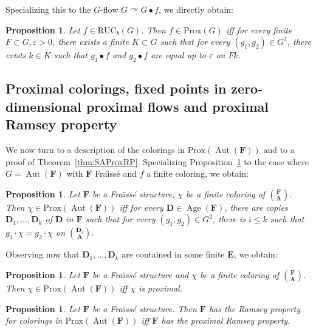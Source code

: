 \documentclass[11pt]{article}
\newtheorem{prop}[theo]{Proposition}
\theoremstyle{definition}
\numberwithin{equation}{section}
\numberwithin{figure}{section}
\numberwithin{table}{section}
\newcommand*{\mA}{\mathbf{A}}
\newcommand*{\mD}{\mathbf{D}}
\newcommand*{\mE}{\mathbf{E}}
\newcommand*{\mF}{\mathbf{F}}
\newcommand{\e}{\varepsilon}
\DeclareMathOperator{\Aut}{Aut}
\DeclareMathOperator{\Age}{Age}
\newcommand{\actson}{\curvearrowright}
\newcommand{\RUCB}{\mathrm{RUC}_{b}}
\begin{document}
Specializing this to the $G$-flow $G\actson \overline{G\bullet f}$, we directly obtain:

\begin{prop}\label{prop:ProxAlg}
Let $f\in \RUCB(G)$. Then $f\in \mathrm{Prox}(G)$ iff for every finite $F\subset G, \e>0$, there exists a finite $K\subset G$ such that for every $(g_{1}, g_{2})\in G^{2}$, there exists $k\in K$ such that $g_{1}\bullet f$ and $g_{2}\bullet f$ are equal up to $\e$ on $Fk$.
\end{prop}


\subsection{Proximal colorings, fixed points in zero-dimensional proximal flows and proximal Ramsey property}
\label{section:ProxColorings}

We now turn to a description of the colorings in $\mathrm{Prox}(\Aut(\mF))$ and to a proof of Theorem~\ref{thm:SAProxRP}. Specializing Proposition~\ref{prop:ProxAlg} to the case where $G=\Aut(\mF)$ with $\mF$ Fra\"{\i}ss\'e and $f$ a finite coloring, we obtain:

\begin{prop}
Let $\mF$ be a Fra\"{\i}ss\'e structure, $\chi$ be a finite coloring of $\binom{\mF}{\mA}$. Then $\chi \in \mathrm{Prox}(\Aut(\mF))$ iff for every $\mD \in \Age(\mF)$, there are copies $\mD_{1},\ldots,\mD_{k}$ of $\mD$ in $\mF$ such that for every $(g_{1}, g_{2})\in G^{2}$, there is $i\leq k$ such that $g_{1}\cdot \chi = g_{2}\cdot \chi$ on $\binom{\mD_{i}}{\mA}$.
\end{prop}

Observing now that $\mD_{1},\ldots,\mD_{k}$ are contained in some finite $\mE$, we obtain:

\begin{prop}\label{prop:ProxColorings}
Let $\mF$ be a Fra\"{\i}ss\'e structure and $\chi$ be a finite coloring of $\binom{\mF}{\mA}$. Then $\chi \in \mathrm{Prox}(\Aut(\mF))$ iff $\chi$ is proximal.
\end{prop}

\begin{prop}
Let $\mF$ be a Fra\"{\i}ss\'e structure. Then $\mF$ has the Ramsey property for colorings in $\mathrm{Prox}(\Aut(\mF))$ iff $\mF$ has the proximal Ramsey property.
\end{prop}
\end{document}
